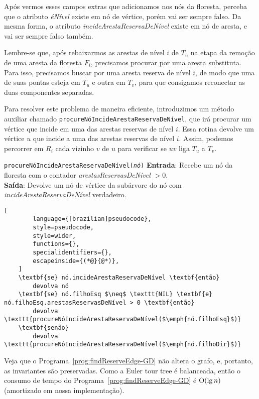 \raggedbottom

Após vermos esses campos extras que adicionamos nos nós da floresta, perceba que o atributo \textit{éNível} existe em nó de vértice, porém vai ser sempre falso. Da mesma forma, o atributo \textit{incideArestaReservaDeNível} existe em nó de aresta, e vai ser sempre falso também. 

Lembre-se que, após rebaixarmos as arestas de nível $i$ de $T_u$ na etapa da remoção de uma aresta da floresta $F_i$, precisamos procurar por uma aresta substituta. Para isso, precisamos buscar por uma aresta reserva de nível $i$, de modo que uma de suas pontas esteja em $T_u$ e outra em $T_v$, para que consigamos reconectar as duas componentes separadas. 

Para resolver este problema de maneira eficiente, introduzimos um método auxiliar chamado \texttt{procureNóIncideArestaReservaDeNível}, que irá procurar um vértice que incide em uma das arestas reservas de nível $i$.
Essa rotina devolve um vértice $u$ que incide a uma das arestas reservas de nível $i$. Assim, podemos percorrer em $R_i$ cada vizinho $v$ de $u$ para verificar se $uv$ liga $T_u$ a $T_v$. 

\begin{programruledcaption}{\texttt{procureNóIncideArestaReservaDeNível(\textit{nó})} \label{prog:findReserveEdge-GD}}
    \noindent\textbf{Entrada}: Recebe um nó da floresta com o contador \textit{arestasReservasDeNível} $> 0$.
    \\
    \noindent\textbf{Saída}: Devolve um nó de vértice da subárvore do nó com \textit{incideArestaReservaDeNível} verdadeiro.
    \vspace{-0.5\baselineskip}
    \begin{lstlisting}[
        language={[brazilian]pseudocode},
        style=pseudocode,
        style=wider,
        functions={},
        specialidentifiers={},
        escapeinside={(*@}{@*)},
    ]
    \textbf{se} nó.incideArestaReservaDeNível \textbf{então}
        devolva nó
    \textbf{se} nó.filhoEsq $\neq$ \texttt{NIL} \textbf{e} nó.filhoEsq.arestasReservasDeNível > 0 \textbf{então}
        devolva \texttt{procureNóIncideArestaReservaDeNível($\emph{nó.filhoEsq}$)}
    \textbf{senão}
        devolva \texttt{procureNóIncideArestaReservaDeNível($\emph{nó.filhoDir}$)}
\end{lstlisting}
\vspace{-0.5\baselineskip}
\end{programruledcaption}

Veja que o Programa~\ref{prog:findReserveEdge-GD} não altera o grafo, e, portanto, as invariantes são preservadas. Como a Euler tour tree é balanceada, então o consumo de tempo do Programa~\ref{prog:findReserveEdge-GD} é $\mathrm{O}(\lg n)$ (amortizado em nossa implementação).

